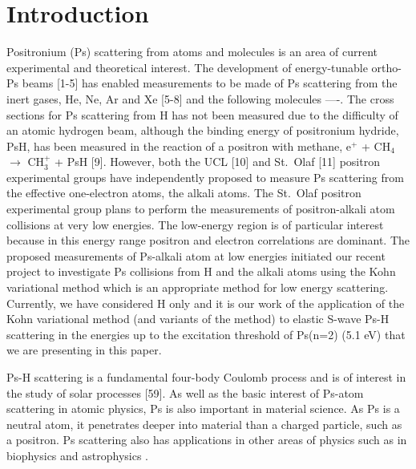\documentclass[preprint,showpacs,preprintnumbers,amsmath,amssymb]{revtex4}
\begin{document}
\section{Introduction}


Positronium (Ps) scattering from atoms and molecules is an area of current experimental and theoretical interest. The development of energy-tunable ortho-Ps beams [1-5] has enabled measurements
to be made of Ps scattering from the inert gases, He, Ne, Ar and Xe [5-8] and the following molecules ----. The cross sections for Ps scattering from H has not been measured due to the difficulty
of an atomic hydrogen beam, although the binding energy of positronium hydride, PsH, has been measured in the reaction of a positron with methane, e$^+$ + CH$_4$ $\to$ CH$_3^+$ + PsH [9].
However, both the UCL [10] and St.~Olaf [11] positron experimental groups have independently proposed to measure  Ps scattering from the effective one-electron atoms, the alkali atoms.
The St.~Olaf positron experimental group  plans to perform the measurements of positron-alkali atom collisions at very low energies. The low-energy region is of particular interest
because in this energy range positron and electron correlations are dominant. The proposed measurements of Ps-alkali atom at low energies initiated our recent project to investigate Ps collisions from
H and the alkali atoms using the Kohn variational method which is an appropriate method for low energy scattering. Currently, we have considered H only and it is our work of the application of the Kohn variational method
(and variants of the method) to elastic S-wave Ps-H scattering in the energies up to the excitation threshold of Ps(n=2) (5.1 eV) that we are presenting in this paper.


Ps-H scattering is a fundamental four-body Coulomb process
and is of interest in the study of solar processes [59].
As well as the basic interest of Ps-atom scattering in atomic physics,
Ps is also important in material science.
As Ps is a neutral atom, it penetrates deeper into material than a charged particle,
such as a positron.
Ps scattering also has applications
in other areas of physics such as in biophysics and astrophysics \cite{}.
\end{document}
